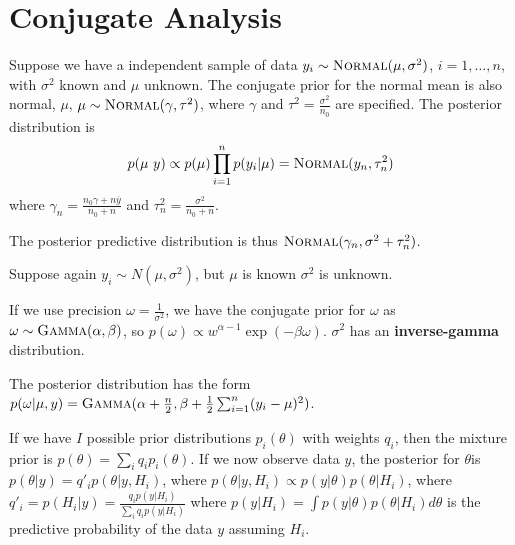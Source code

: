\section{Conjugate Analysis}
\label{sec:conjugate-analysis}

\begin{thm}
  \label{sec:conjugate-analysis-1}
  Suppose we have a independent sample of data $y_{i} \sim
  \textsc{Normal}(\mu, \sigma^{2})$, $i = 1, \dots, n$, with $\sigma^{2}$ known
  and $\mu$ unknown.  The conjugate prior for the normal mean is also
  normal, $\mu$, $\mu \sim \textsc{Normal}(\gamma, \tau^{2})$, where $\gamma$
  and $\tau^{2} = \frac{\sigma^{2}}{n_{0}} $ are specified.  The posterior distribution is
  \begin{align}
    \label{eq:11}
    p(\mu \ y) \propto p(\mu) \prod_{i=1}^{n} p(y_{i} | \mu) =
    \textsc{Normal}(y_{n}, \tau^{2}_{n})
  \end{align} where $\gamma_{n} = \frac{n_{0} \gamma + n \overline
    y}{n_{0} + n}$ and $\tau^{2}_{n} = \frac{\sigma^{2}}{n_{0} + n}$.

  The posterior predictive distribution is thus $\textsc{Normal}(\gamma_{n},
  \sigma^{2} + \tau_{n}^{2})$.
\end{thm}

\begin{thm}
  \label{sec:conjugate-analysis-2}
  Suppose again $y_{i} \sim N(\mu, \sigma^{2})$, but $\mu$ is known
  $\sigma^{2}$ is unknown.

  If we use precision $\omega = \frac{1}{\sigma^{2}}$, we have the
  conjugate prior for $\omega$ as $\omega \sim \textsc{Gamma}(\alpha, \beta)$,
  so $p(\omega) \propto w^{\alpha-1} \exp(-\beta \omega)$.
  $\sigma^{2}$ has an \textbf{inverse-gamma} distribution.

  The posterior distribution has the form $p(\omega | \mu, y) =
  \textsc{Gamma}(\alpha + \frac{n}{2}, \beta + \frac{1}{2} \sum_{i=1}^{n}
  (y_{i} - \mu)^{2})$.
\end{thm}

\begin{thm}
  \label{sec:conjugate-analysis-3}
  If we have $I$ possible prior distributions $p_{i}(\theta)$ with
  weights $q_{i}$, then the mixture prior is $p(\theta) = \sum_{i}^{}
  q_{i} p_{i}(\theta)$.  If we now observe data $y$, the posterior for
  $\theta$is $p(\theta | y) = q'_{i}p(\theta | y, H_{i})$, where
  $p(\theta | y, H_{i}) \propto p(y | \theta) p(\theta | H_{i})$, where
  $q'_{i} = p(H_{i} | y) = \frac{q_{i} p(y | H_{i})}{\sum_{i} q_{i} p
    (y|H_{i})}$ where $p(y | H_{i}) = \int p(y | \theta) p(\theta |
  H_{i}) d\theta$ is the predictive probability of the data $y$
  assuming $H_{i}$.
\end{thm}

